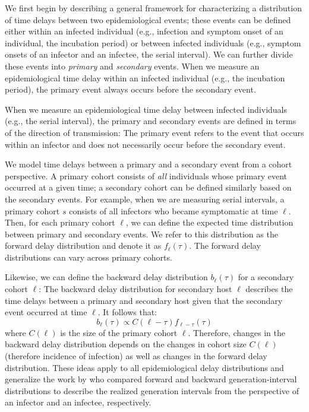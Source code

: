 \documentclass[12pt]{article}
\newcommand{\comment}{\nocomment}
\newcommand{\nocomment}[3]{}
\newcommand{\jd}[1]{\comment{cyan}{JD}{#1}}
\begin{document}
We first begin by describing a general framework for characterizing a distribution of time delays between two epidemiological events;
these events can be defined either within an infected individual (e.g., infection and symptom onset of an individual, the incubation period) or between infected individuals (e.g., symptom onsets of an infector and an infectee, the serial interval).
We can further divide these events into \emph{primary} and \emph{secondary} events.
When we measure an epidemiological time delay within an infected individual (e.g., the incubation period), the primary event always occurs before the secondary event.
\jd{Rethink, or else rethink ``any'' above: the ``hidden'' time (my term) is the time between onset of infectiousness and onset of symptoms; it is within, but can be positive or negative. I'm not saying we should use it here\ldots}
When we measure an epidemiological time delay between infected individuals (e.g., the serial interval), 
the primary and secondary events are defined in terms of the direction of transmission:
The primary event refers to the event that occurs within an infector and does not necessarily occur before the secondary event.

We model time delays between a primary and a secondary event from a cohort perspective.
A primary cohort consists of \emph{all} individuals whose primary event occurred at a given time; 
a secondary cohort can be defined similarly based on the secondary events.
For example, when we are measuring serial intervals, a primary cohort $s$ consists of all infectors who became symptomatic at time $\ell$.
Then, for each primary cohort $\ell$, we can define the expected time distribution between primary and secondary events.
We refer to this distribution as the forward delay distribution and denote it as $f_\ell(\tau)$.
The forward delay distributions can vary across primary cohorts.

Likewise, we can define the backward delay distribution $b_\ell(\tau)$ for a secondary cohort $\ell$:
The backward delay distribution for secondary host $\ell$ describes the time delays between a primary and secondary host given that the secondary event occurred at time $\ell$.
It follows that:
\begin{equation}
b_\ell(\tau) \propto C(\ell-\tau) f_{\ell-\tau}(\tau)
\end{equation}
where $C(\ell)$ is the size of the primary cohort $\ell$.
Therefore, changes in the backward delay distribution depends on the changes in cohort size $C(\ell)$ (therefore incidence of infection) as well as changes in the forward delay distribution.
These ideas apply to all epidemiological delay distributions and generalize the work by \citep{champredon2015intrinsic} who compared forward and backward generation-interval distributions to describe the realized generation intervals from the perspective of an infector and an infectee, respectively.
\end{document}
